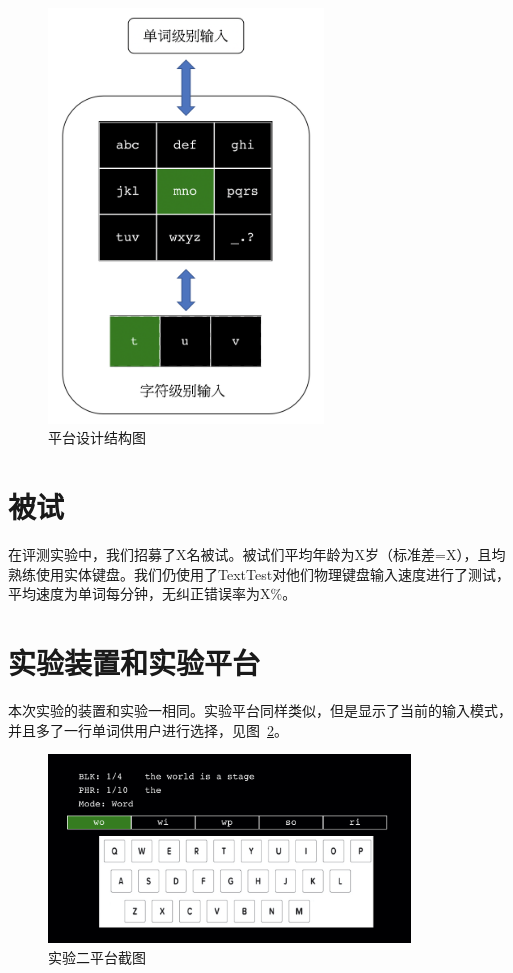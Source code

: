 \begin{figure}[htbp] %
    \centering
    \includegraphics[height=11cm]{figures/design.png}
    \caption{平台设计结构图}
    \label{fig:design}
\end{figure}

\section{被试}
在评测实验中，我们招募了X名被试。被试们平均年龄为X岁（标准差=X），且均熟练使用实体键盘。我们仍使用了TextTest\cite{texttest}\cite{wobbrock2006analyzing}对他们物理键盘输入速度进行了测试，平均速度为单词每分钟，无纠正错误率为X\%。

\section{实验装置和实验平台}
本次实验的装置和实验一相同。实验平台同样类似，但是显示了当前的输入模式，并且多了一行单词供用户进行选择，见图~\ref{fig:platform1}。

\begin{figure}[h] %
    \centering
    \includegraphics[height=5cm]{figures/platform1.jpg}
    \caption{实验二平台截图}
    \label{fig:platform1}
\end{figure}


